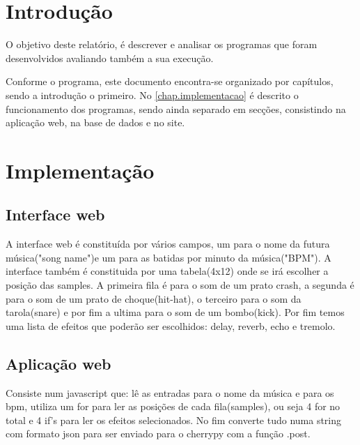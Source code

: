\documentclass{report}
\begin{document}
\tableofcontents


\clearpage
{}

\chapter{Introdução}
\label{chap.introducao}

O objetivo deste relatório, é descrever e analisar os programas que foram desenvolvidos avaliando também a sua execução.

Conforme o programa, este documento encontra-se organizado por capítulos, sendo a introdução o primeiro. No \autoref{chap.implementacao} é descrito o funcionamento dos programas, sendo ainda separado em secções, consistindo na aplicação web, na base de dados e no site.

\chapter{Implementação}
\label{chap.implementacao}

\section{Interface web}
\label{sec.Interface web}


A interface web é constituída por vários campos, um para o nome da futura música("song name")e um para as batidas por minuto da música("BPM").
A interface também é constituida por uma tabela(4x12) onde se irá escolher a posição das samples. A primeira fila é para o som de um prato crash, a segunda é para o som de
um prato de choque(hit-hat), o terceiro para o som da tarola(snare) e por fim a ultima para o som de um bombo(kick). Por fim temos uma lista de efeitos que poderão ser escolhidos: delay, reverb, echo e tremolo.
\section{Aplicação web}
\label{sec.Aplicação web}
Consiste num javascript que: lê as entradas para o nome da música e para os bpm, utiliza um for para ler as posições de cada fila(samples), ou seja 4 for no total e 4 if's para
ler os efeitos selecionados. No fim converte tudo numa string com formato json para ser enviado para o cherrypy com a função .post.
\end{document}
